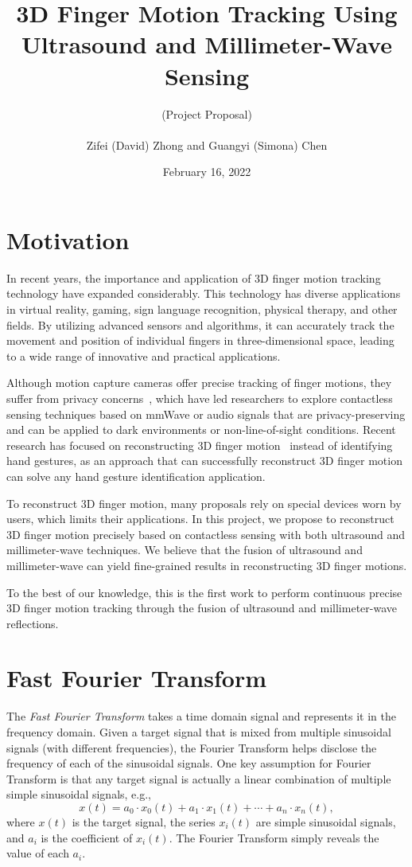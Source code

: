 \documentclass[11pt, oneside]{article}   	%
\title{3D Finger Motion Tracking Using Ultrasound and Millimeter-Wave Sensing}
\author{(Project Proposal)\\ \\Zifei (David) Zhong and Guangyi (Simona) Chen}
\date{February 16, 2022}							%
\begin{document}
\maketitle

\section{Motivation}
In recent years, the importance and application of 3D finger motion tracking technology have expanded considerably. This technology has diverse applications in virtual reality, gaming, sign language recognition, physical therapy, and other fields. By utilizing advanced sensors and algorithms, it can accurately track the movement and position of individual fingers in three-dimensional space, leading to a wide range of innovative and practical applications.

Although motion capture cameras offer precise tracking of finger motions, they suffer from privacy concerns~\cite{ref:cameraprivacy18}, which have led researchers to explore contactless sensing techniques based on mmWave or audio signals that are privacy-preserving and can be applied to dark environments or non-line-of-sight conditions. Recent research has focused on reconstructing 3D finger motion~\cite{ref:neuropose21, ref:sslotr22, ref:mm4arm23} instead of identifying hand gestures, as an approach that can successfully reconstruct 3D finger motion can solve any hand gesture identification application.

To reconstruct 3D finger motion, many proposals rely on special devices worn by users, which limits their applications. In this project, we propose to reconstruct 3D finger motion precisely based on contactless sensing with both ultrasound and millimeter-wave techniques. We believe that the fusion of ultrasound and millimeter-wave can yield fine-grained results in reconstructing 3D finger motions.

To the best of our knowledge, this is the first work to perform continuous precise 3D finger motion tracking through the fusion of ultrasound and millimeter-wave reflections.

\section{Fast Fourier Transform}
The \emph{Fast Fourier Transform} takes a time domain signal and represents it in the frequency domain. Given a target signal that is mixed from multiple sinusoidal signals (with different frequencies), the Fourier Transform helps disclose the frequency of each of the sinusoidal signals. One key assumption for Fourier Transform is that any target signal is actually a linear combination of multiple simple sinusoidal signals, e.g., 
$$x(t) = a_0 \cdot x_0(t) + a_1 \cdot x_1(t) + \cdots + a_n \cdot x_n(t),$$
where $x(t)$ is the target signal, the series $x_i(t)$ are simple sinusoidal signals, and $a_i$ is the coefficient of $x_i(t)$. The Fourier Transform simply reveals the value of each $a_i$.
\end{document}

